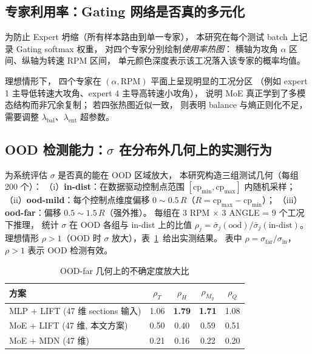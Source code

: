 \subsection{专家利用率：Gating 网络是否真的多元化}

为防止 Expert 坍缩（所有样本路由到单一专家），
本研究在每个测试 batch 上记录 Gating softmax 权重，
对四个专家分别绘制\emph{使用率热图}：
横轴为攻角 $\alpha$ 区间、纵轴为转速 RPM 区间，
单元颜色深度表示该工况落入该专家的概率均值。

理想情形下，
四个专家在 $(\alpha, \text{RPM})$ 平面上呈现明显的工况分区
（例如 expert 1 主导低转速大攻角、expert 4 主导高转速小攻角），
说明 MoE 真正学到了多模态结构而非冗余复制；
若四张热图近似一致，
则表明 balance 与熵正则化不足，需要调整 $\lambda_{\text{bal}}$、$\lambda_{\text{ent}}$ 超参数。

\subsection{OOD 检测能力：\texorpdfstring{$\sigma$}{sigma} 在分布外几何上的实测行为}
\label{sec:ood_finding}

为系统评估 $\sigma$ 是否真的能在 OOD 区域放大，
本研究构造三组测试几何（每组 200 个）：
（i）\textbf{in-dist}：在数据驱动控制点范围 $[\text{cp}_{\min}, \text{cp}_{\max}]$ 内随机采样；
（ii）\textbf{ood-mild}：每个控制点维度偏移 $0\sim 0.5\,R$（$R = \text{cp}_{\max} - \text{cp}_{\min}$）；
（iii）\textbf{ood-far}：偏移 $0.5\sim 1.5\,R$（强外推）。
每组在 3 RPM $\times$ 3 ANGLE = 9 个工况下推理，
统计 $\sigma$ 在 OOD 各组与 in-dist 上的比值
$\rho_j = \bar\sigma_j(\text{ood}) / \bar\sigma_j(\text{in-dist})$。
理想情形 $\rho > 1$（OOD 时 $\sigma$ 放大），表~\ref{tab:ood_sigma}~给出实测结果。
表中 $\rho = \sigma_\text{far}/\sigma_\text{in}$，$\rho>1$ 表示 OOD 检测有效。

\begin{table}[htbp]
\centering
\caption{OOD-far 几何上的不确定度放大比}
\label{tab:ood_sigma}
\begin{tabular}{lcccc}
\toprule
\textbf{方案} & \textbf{$\rho_T$} & \textbf{$\rho_H$} & \textbf{$\rho_{M_y}$} & \textbf{$\rho_Q$} \\
\midrule
MLP + LIFT (47 维 sections 输入) & 1.06 & \textbf{1.79} & \textbf{1.71} & 1.08 \\
MoE + LIFT (47 维, 本文方案)     & 0.50 & 0.40 & 0.59 & 0.51 \\
MoE + MDN (47 维)                & 0.21 & 0.16 & 0.22 & 0.20 \\
\bottomrule
\end{tabular}
\end{table}

